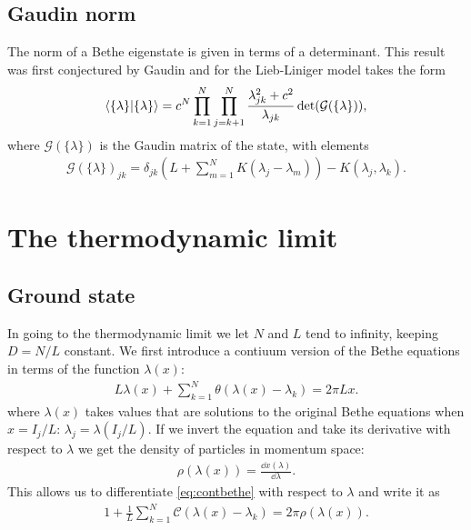 \documentclass[11pt, a4paper]{report} %
\begin{document}
\subsection{Gaudin norm}
The norm of a Bethe eigenstate is given in terms of a determinant.
This result was first conjectured by Gaudin and for the Lieb-Liniger model takes the form~\cite{Caux2007}
\begin{align}
  \braket{\{\lambda\}}{\{\lambda\}} = c^N \prod_{k=1}^N \prod_{j=k+1}^N \frac{\lambda_{jk}^2 + c^2}{\lambda_{jk}} \det(\mathcal{G}(\{\lambda\})),
\end{align}
where $\mathcal{G}(\{\lambda\})$ is the Gaudin matrix of the state, with elements
\begin{align}\label{eq:gaudin}
  \mathcal{G}(\{\lambda\})_{jk} = \delta_{jk} \left(L + \sum_{m=1}^{N}K(\lambda_j-\lambda_m)\right) - K(\lambda_j, \lambda_k).
\end{align}


\section{The thermodynamic limit}
\subsection{Ground state}
In going to the thermodynamic limit we let \(N\) and \(L\) tend to infinity, keeping \(D=N/L\) constant.
We first introduce a contiuum version of the Bethe equations in terms of the function \(\lambda(x)\):
\begin{align}
  \label{eq:contbethe}
  L \lambda(x) + \sum_{k=1}^N\theta(\lambda(x)-\lambda_k) = 2 \pi L x.
\end{align}
where \(\lambda(x)\) takes values that are solutions to the original Bethe equations when \(x=I_j/L\): \(\lambda_j=\lambda(I_j/L)\).
If we invert the equation and take its derivative with respect to \(\lambda\) we get the density of particles in momentum space:
\begin{align}
  \rho(\lambda(x)) = \frac{\dd x(\lambda)}{\dd \lambda}.
\end{align}
This allows us to differentiate \cref{eq:contbethe} with respect to \(\lambda\) and write it as 
\begin{align}
  1+\frac{1}{L} \sum_{k=1}^{N} \mathcal{C}(\lambda(x)- \lambda_k) = 2\pi \rho(\lambda(x)).
\end{align}
\end{document}
